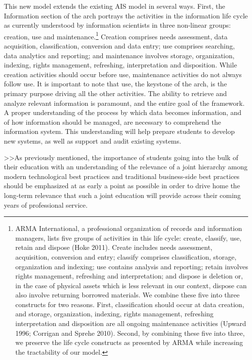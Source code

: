 \documentclass[12pt]{article}
\begin{document}
This new model extends the existing AIS model in several ways. First, the Information section of the arch portrays the activities in the information life cycle as currently understood by information scientists in three non-linear groups: creation, use and maintenance.\footnote{ARMA International, a professional organization of records and information managers, lists five groups of activities in this life cycle: create, classify, use, retain and dispose (Hoke 2011). Create includes needs assessment, acquisition, conversion and entry; classify comprises classification, storage, organization and indexing; use contains analysis and reporting; retain involves rights management, refreshing and interpretation; and dispose is deletion or, in the case of physical assets which is less relevant in our context, dispose can also involve returning borrowed materials. We combine these five into three constructs for two reasons. First, classification should occur at data creation, and storage, organization, indexing, rights management, refreshing interpretation and disposition are all ongoing maintenance activities (Upward 1996; Corrigan and Sprehe 2010). Second, by combining these five into three, we preserve the life cycle constructs as presented by ARMA while increasing the tractability of our model.} Creation comprises needs assessment, data acquisition, classification, conversion and data entry; use comprises searching, data analytics and reporting; and maintenance involves storage, organization, indexing, rights management, refreshing, interpretation and disposition. While creation activities should occur before use, maintenance activities do not always follow use. It is important to note that use, the keystone of the arch, is the primary purpose driving all the other activities. The ability to retrieve and analyze relevant information is paramount, and the entire goal of the framework. A proper understanding of the process by which data becomes information, and of how information should be managed, are necessary to comprehend the information system. This understanding will help prepare students to develop new systems, as well as support and audit existing systems.

>>As previously mentioned, the importance of students going into the bulk of their education with an understanding of the relevance of a joint hierarchy among modern technological best practices and traditional business-side best practices should be emphasized at as early a point as possible in order to drive home the long-term relevance that such a joint education will provide across their coming years of professional service.
\end{document}
